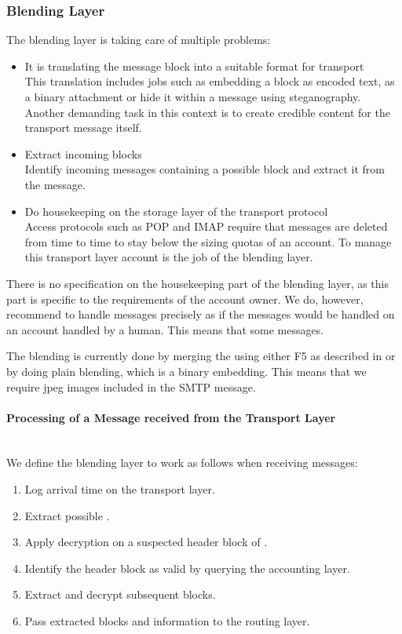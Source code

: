 \subsubsection{Blending Layer\label{sec:blendingLayer}}
The blending layer is taking care of multiple problems:
\begin{itemize}
	\item It is translating the message block into a suitable format for transport\\
	This translation includes jobs such as embedding a block as encoded text, as a binary attachment or hide it within a message using steganography. Another demanding task in this context is to create credible content for the transport message itself.
	\item Extract incoming blocks\\
	Identify incoming messages containing a possible block and extract it from the message.
	\item Do housekeeping on the storage layer of the transport protocol\\
	Access protocols such as POP and IMAP require that messages are deleted from time to time to stay below the sizing quotas of an account. To manage this transport layer account is the job of the blending layer.
\end{itemize}

There is no specification on the housekeeping part of the blending layer, as this part is specific to the requirements of the account owner. We do, however, recommend to handle messages precisely as if the messages would be handled on an account handled by a human. This means that some messages. 

The blending is currently done by merging the \VortexMessage using either F5 as described in \cite{f5} or by doing plain blending, which is a binary embedding. This means that we require jpeg images included in the SMTP message. 

\paragraph{Processing of a Message received from the Transport Layer}~\\
We define the blending layer to work as follows when receiving messages:
\begin{enumerate}
	\item Log arrival time on the transport layer.
	\item Extract possible \VortexMessage.
	\item Apply decryption on a suspected header block of \VortexMessage.
	\item Identify the header block as valid by querying the accounting layer.
	\item Extract and decrypt subsequent blocks.
	\item Pass extracted blocks and information to the routing layer.
\end{enumerate}


